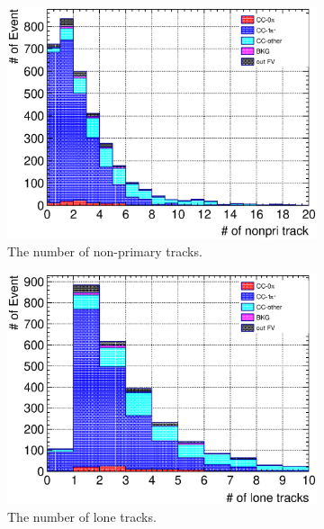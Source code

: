 \begin{figure}
  \begin{subfigure}{\dbfigwid\textwidth}
       \includegraphics[width=\textwidth]{figures/sel/TPCmu_nnonpritrk_stack_al8.eps}
       \caption{The number of non-primary tracks.}
       \label{subfig:tlpi-trknum-nonpri}
  \end{subfigure}
  \begin{subfigure}{\dbfigwid\textwidth}
       \includegraphics[width=\textwidth]{figures/sel/TPCmu_nlon_stack_al8.eps}
       \caption{The number of lone tracks.}
       \label{subfig:tlpi-trknum-lone}
  \end{subfigure}
  \\
  \begin{subfigure}{\dbfigwid\textwidth}

\end{subfigure}
\end{figure}
